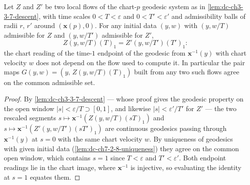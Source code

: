 \begin{lemma}
  \label{lem:dc-ch3-3-7-flow-agree}


  Let $Z$ and $Z'$ be two local flows of the chart-$p$ geodesic system as in
  \cref{lem:dc-ch3-3-7-descent}, with time scales $0<T<\varepsilon$ and
  $0<T'<\varepsilon'$ and admissibility balls of radii $r$, $r'$ around
  $(\mathbf{x}(p),0)$. For any initial data $(y,w)$ with $(y,w/T)$ admissible
  for $Z$ and $(y,w/T')$ admissible for $Z'$,
  $$Z(y,w/T)(T)_1=Z'(y,w/T')(T')_1:$$
  the chart reading of the time-$1$ endpoint of the geodesic from
  $\mathbf{x}^{-1}(y)$ with chart velocity $w$ does not depend on the flow
  used to compute it. In particular the pair maps
  $G(y,w)=(y,\,Z(y,w/T)(T)_1)$ built from any two such flows agree on the
  common admissible set.
\end{lemma}
\begin{proof}
  \sketch

  By \cref{lem:dc-ch3-3-7-descent} — whose proof gives the geodesic property
  on the open window $|s|<\varepsilon/T\supset[0,1]$, and likewise
  $|s|<\varepsilon'/T'$ for $Z'$ — the two rescaled segments
  $s\mapsto\mathbf{x}^{-1}(Z(y,w/T)(sT)_1)$ and
  $s\mapsto\mathbf{x}^{-1}(Z'(y,w/T')(sT')_1)$ are continuous geodesics
  passing through $\mathbf{x}^{-1}(y)$ at $s=0$ with the same chart velocity
  $w$. By uniqueness of geodesics with given initial data
  (\cref{lem:dc-ch7-2-8-uniqueness}) they agree on the common open window,
  which contains $s=1$ since $T<\varepsilon$ and $T'<\varepsilon'$. Both
  endpoint readings lie in the chart image, where $\mathbf{x}^{-1}$ is
  injective, so evaluating the identity at $s=1$ equates them.
\end{proof}

